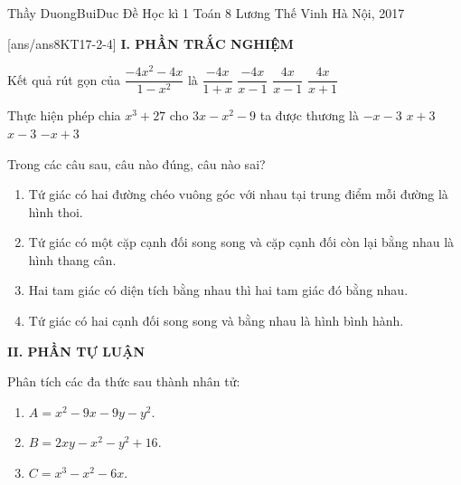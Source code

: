 \begin{name}
{Thầy  DuongBuiDuc}
{Đề Học kì 1 Toán 8 Lương Thế Vinh Hà Nội, 2017}
\end{name}
\setcounter{ex}{0}
[ans/ans8KT17-2-4]
\noindent\textbf{I. PHẦN TRẮC NGHIỆM}
\begin{ex}%
Kết quả rút gọn của $\dfrac{-4x^{2}-4x}{1-x^{2}}$ là
\choice
{$\dfrac{-4x}{1+x}$}
{$\dfrac{-4x}{x-1}$}
{\True $\dfrac{4x}{x-1}$}
{$\dfrac{4x}{x+1}$}
\end{ex}
\begin{ex}%
Thực hiện phép chia $x^{3}+27$ cho $3x-x^{2}-9$ ta được thương là
\choice
{\True $-x-3$}
{$x+3$}
{$x-3$}
{$-x+3$}
\end{ex}
\begin{ex}%
Trong các câu sau, câu nào đúng, câu nào sai?
\begin{enumerate}
\item Tứ giác có hai đường chéo vuông góc với nhau tại trung điểm mỗi đường là hình thoi.
\item Tứ giác có một cặp cạnh đối song song và cặp cạnh đối còn lại bằng nhau là hình thang cân.
\item Hai tam giác có diện tích bằng nhau thì hai tam giác đó bằng nhau.
\item Tứ giác có hai cạnh đối song song và bằng nhau là hình bình hành.
\end{enumerate}
\end{ex}
\noindent\textbf{II. PHẦN TỰ LUẬN}
\setcounter{ex}{0}
\begin{ex}%
Phân tích các đa thức sau thành nhân tử:
\begin{multicols}{2}
\columnsep=2pt
\columnseprule=0pt
\begin{enumerate}
\item $A=x^{2}-9x-9y-y^{2}$.
\item $B=2xy-x^{2}-y^{2}+16$.
\item $C=x^{3}-x^{2}-6x$.
\end{enumerate}
\end{multicols}
\end{ex}
